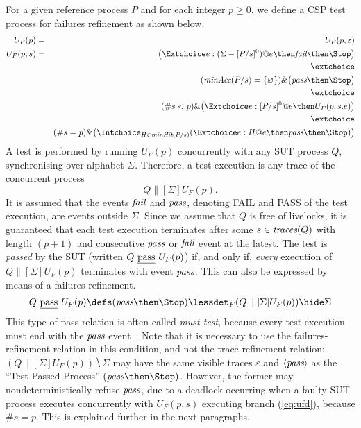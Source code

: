 For a given reference process $P$ and for each integer $p\ge 0$, we define a
CSP test process for failures refinement as shown below.
%
\begin{eqnarray}
U_F(p) & = & U_F(p,\varepsilon)
\\
U_F(p,s) & = & \big( \Extchoice e:(\Sigma - [P/s]^0) @ e \then \efail\then \Stop \big)
\label{eq:ufa}
\\ & & \extchoice \nonumber
\\ & & (\minaccs(P/s) = \{ \varnothing \})    \&   \big( \epass \then \Stop \big)
\label{eq:ufb}
\\ & & \extchoice \nonumber
\\ & & (\#s < p) \& \big( \Extchoice e:[P/s]^0 @ e \then U_F(p,s.e) \big)
\label{eq:ufc}
\\ & & \extchoice \nonumber
\\ & & (\#s = p ) \& \big( \Intchoice_{H\in\minhits(P/s)} ( \Extchoice e:H @ e \then \epass \then\Stop   )  \big)
\label{eq:ufd}
\end{eqnarray}
%
A test is performed by running $U_F(p)$ concurrently with any SUT process $Q$,
synchronising over alphabet $\Sigma$. Therefore, a test execution is any
trace of the concurrent process
\[
Q\parallel[\Sigma] U_F(p).
\]
It is assumed that the events ${\text{\it fail}}$ and ${\text{\it pass}}$, denoting FAIL and PASS
of the test execution, are events outside $\Sigma$. Since we assume that $Q$
is free of livelocks, it is guaranteed that each test execution terminates
after some $s\in\text{\it traces}(Q)$ with length $(p+1)$ and consecutive ${\text{\it pass}}$ or ${\text{\it fail}}$ event at the latest. The test is
\emph{passed} by the SUT (written $Q\ \pass\ U_F(p)$) if, and only if, {\it
every} execution of $Q\parallel[\Sigma] U_F(p)$ terminates with   event
${\text{\it pass}}$. This can also be  expressed by means of a failures refinement.
%
\begin{equation}
\label{eq:passF}
Q\ \pass\ U_F(p) \defs (\epass\then\Stop) \lessdet_F (Q\parallel[\Sigma] U_F(p)) \hide \Sigma
\end{equation}
%
This type of pass relation is often called \emph{must test}, because every
test execution must end with the ${\text{\it pass}}$
event~\cite{Hennessy:1988:ATP:50497}. Note that it is necessary to use the
failures-refinement relation in this condition, and not the trace-refinement
relation:~$(Q\parallel[\Sigma] U_F(p)) \hide \Sigma$ may have  the same
visible traces $\varepsilon$ and $\langle {\text{\it pass}}\rangle$ as the ``Test Passed
Process'' $(\epass\then\Stop)$. However, the former may nondeterministically
refuse ${\text{\it pass}}$, due to a deadlock occurring when a faulty SUT process
executes concurrently with $U_F(p,s)$ executing branch (\ref{eq:ufd}),
because $\#s = p$. This is explained further in the next paragraphs.

